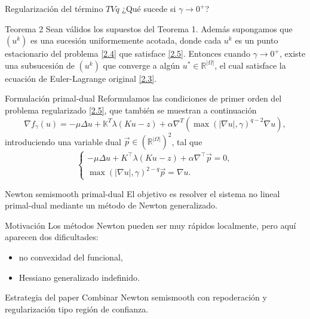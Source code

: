 \documentclass[9pt]{beamer}
\begin{document}
\begin{frame}{Regularización del término $TVq$}
    ¿Qué sucede si $\gamma\to 0^+$?
    \begin{block}{Teorema 2}
        Sean válidos los supuestos del Teorema 1. Además supongamos que $(u^k)$ es una sucesión uniformemente acotada, donde cada $u^k$ es un punto estacionario del problema \eqref{2.4} que satisface \eqref{2.5}. Entonces cuando $\gamma\to 0^+$, existe una subsucesión de $(u^k)$ que converge a algún $u^*\in \mathbb{R}^|\Omega|$, el cual satisface la ecuación de Euler-Lagrange original \eqref{2.3}.
    \end{block}
\end{frame}
\begin{frame}{Formulación primal-dual}
Reformulamos las condiciones de primer orden del problema regularizado \eqref{2.5}, que también se muestran a continuación
\begin{equation}
     \nabla f_\gamma(u)=-\mu\Delta u+\mathbb{K}^T\lambda(Ku-z)+\alpha \nabla^T(\max(|\nabla u|,\gamma)^{q-2}\nabla u),
    \end{equation}
introduciendo una variable dual $\overrightarrow{p}\in (\mathbb{R}^{|\Omega|})^2$, tal que
\begin{equation}
\begin{cases}
-\mu\Delta u + K^\top\lambda(Ku-z)+\alpha\nabla^\top \overrightarrow{p}=0,\\[4pt]
\max(|\nabla u|,\gamma)^{2-q}\overrightarrow{p}=\nabla u.
\end{cases}
\label{2.8}    
\end{equation}
\end{frame}
\begin{frame}{Newton semismooth primal-dual}
El objetivo es resolver el sistema no lineal primal-dual mediante un método de Newton generalizado.

\begin{block}{Motivación}
Los métodos Newton pueden ser muy rápidos localmente, pero aquí aparecen dos dificultades:
\begin{itemize}
    \item no convexidad del funcional,
    \item Hessiano generalizado indefinido.
\end{itemize}
\end{block}

\begin{alertblock}{Estrategia del paper}
Combinar Newton semismooth con repoderación y regularización tipo región de confianza.
\end{alertblock}
\end{frame}
\end{document}
